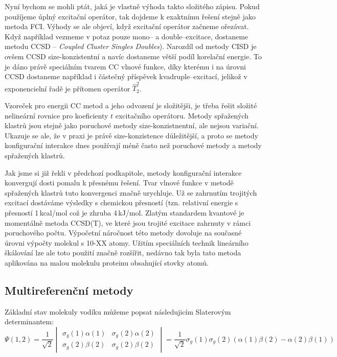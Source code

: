 Nyní bychom se mohli ptát, jaká je vlastně výhoda takto složitého zápisu.
Pokud použíjeme úplný excitační operátor, tak dojdeme k exaktnímu řešení stejně jako metoda FCI.
Výhody se ale objeví, když excitační operátor začneme ořezávat. Když například vezmeme v potaz pouze mono-- a double--excitace, dostaneme metodu CCSD -- \textit{Coupled Cluster Singles Doubles}).
Narozdíl od metody CISD je ovšem CCSD size-konzistentní a navíc dostaneme větší podíl korelační energie.
To je dáno právě speciálním tvarem CC vlnové funkce, díky kterému i na úrovni CCSD dostaneme například i částečný příspěvek kvadruple--excitací, jelikož v exponencielní řadě je přítomen operátor $\hat{T}_2^2$.

Vzoreček pro energii CC metod a jeho odvození je složitějši, je třeba řešit složité nelineární rovnice pro koeficienty $t$ excitačního operátoru. Metody spřažených klastrů jsou stejně jako poruchové metody size-konzistnentní, ale nejsou variační. Ukazuje se ale, že v praxi je právě size-konzistence důležitější, a proto se metody konfigurační interakce dnes používají méně často než poruchové metody a metody spřažených klastrů.

Jak jsme si již řekli v předchozí podkapitole, metody konfigurační interakce konvergují dosti pomalu k přesnému řešení. Tvar vlnové funkce v metodě spřažených klastrů tuto konvergenci značně urychluje. Už se zahrnutím trojitých excitací dostáváme výsledky s chemickou přesností (tzn. relativní energie s přesností 1\,kcal/mol což je zhruba 4\,kJ/mol.
Zlatým standardem kvantové je momentálně metoda CCSD(T), ve které jsou trojité excitace zahrnuty v rámci poruchového počtu. Výpočetní náročnost této metody dovoluje na současné úrovni výpočty molekul s 10-XX atomy. Užitím speciálních technik lineárního škálování lze ale toto použití značně rozšířit, nedávno tak byla tato metoda aplikována na malou molekulu proteinu obsahující stovky atomů. 

\subsection{Multireferenční metody}

Základní stav molekuly vodíku můžeme popsat následujicím Slaterovým determinantem:
\begin{equation}
\Psi (1,2)=\frac{1}{\sqrt{2}}
\begin{vmatrix}
\sigma_g(1)\alpha (1) & \sigma_g(2)\alpha (2) \\
\sigma_g(2)\beta (2) & \sigma_g(2)\beta (2)
\end{vmatrix}
=\frac{1}{\sqrt{2}}\sigma_g(1)\sigma_g(2)(\alpha (1)\beta (2)-\alpha (2)\beta (1))
\end{equation}
